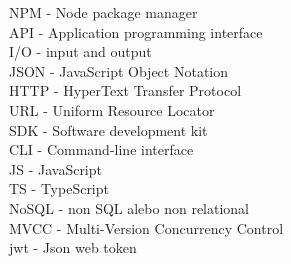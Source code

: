 NPM - Node package manager\\
API - Application programming interface\\
I/O - input and output\\
JSON - JavaScript Object Notation\\
HTTP - HyperText Transfer Protocol\\
URL - Uniform Resource Locator\\
SDK - Software development kit\\
CLI - Command-line interface\\
JS - JavaScript\\
TS - TypeScript\\
NoSQL - non SQL alebo non relational\\
MVCC - Multi-Version Concurrency Control\\
jwt - Json web token\\